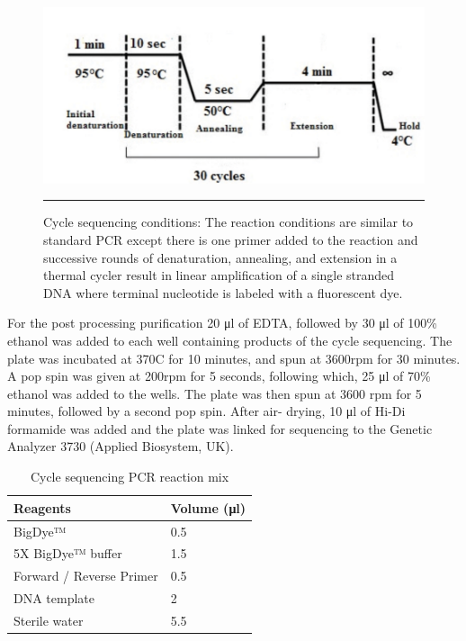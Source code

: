 \begin{refsection}
\begin{figure}[!b]
\centering
\includegraphics[width=\linewidth]{Figures/2_7cycseqconditions.pdf} 
\rule{35em}{0.5pt}
\caption{Cycle sequencing conditions: The reaction conditions are similar to standard PCR except there is one primer added to the reaction and successive rounds of denaturation, annealing, and extension in a thermal cycler result in linear amplification of a single stranded DNA where terminal nucleotide is labeled with a fluorescent dye.}
\label{fig:2_7cycseqconditions}
\end{figure}

For the post processing purification 20 μl of EDTA, followed by 30 μl of 100\% ethanol was added to each well containing products of the cycle sequencing. The plate was incubated at 370C for 10 minutes, and spun at 3600rpm for 30 minutes. A pop spin was given at 200rpm for 5 seconds, following which, 25 μl of 70\% ethanol was added to the wells. The plate was then spun at 3600 rpm for 5 minutes, followed by a second pop spin. After air- drying, 10 μl of Hi-Di formamide was added and the plate was linked for sequencing to the Genetic Analyzer 3730 (Applied Biosystem, UK). 

\begin{table}[!h]
\centering
\caption{Cycle sequencing PCR reaction mix}
\label{tab:2.3cycseqmm}
\begin{tabular}{  l  l  }
\hline
	Reagents           & Volume (μl) \\ \hline
	BigDye™ & 0.5 \\ \hline
	5X BigDye™ buffer & 1.5 \\ \hline
	Forward / Reverse Primer & 0.5 \\ \hline
	DNA template & 2 \\ \hline
	Sterile water & 5.5 \\ \hline
\end{tabular}
\end{table}


\end{refsection}
